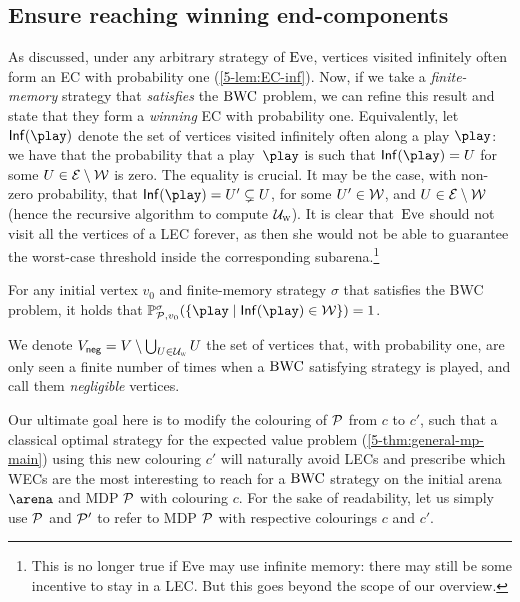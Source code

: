 \subsection*{Ensure reaching winning end-components} As discussed, under any arbitrary strategy of $\text{Eve}$, vertices visited infinitely often form an EC with probability one (\cref{5-lem:EC-inf}). Now, if we take a \textit{finite-memory} strategy that \textit{satisfies} the $\text{BWC}$ problem, we can refine this result and state that they form a \textit{winning} EC with probability one. Equivalently, let $\infVisited{\play}$ denote the set of vertices visited infinitely often along a play $\play$: we have that the probability that a play~$\play$ is such that $\infVisited{\play} = \ec$ for some $U \in \mathcal{E} \setminus \mathcal{W}$ is zero. The equality is crucial. It may be the case, with non-zero probability, that $\infVisited{\play} = \ec' \subsetneq \ec$, for some $U' \in \mathcal{W}$, and $U \in \mathcal{E} \setminus \mathcal{W}$ (hence the recursive algorithm to compute $\mathcal{U}_{\textsc{w}}$). It is clear that~$\text{Eve}$ should not visit all the vertices of a LEC forever, as then she would not be able to guarantee the worst-case threshold inside the corresponding subarena.\footnote{This is no longer true if Eve may use infinite memory: there may still be some incentive to stay in a LEC. But this goes beyond the scope of our overview.}

\begin{lemma}
\label{12-lem:EC-inf}
For any initial vertex $ v_0 $ and finite-memory strategy $ \sigma $ that satisfies the BWC problem, it holds that $ \probm^\sigma_{\markovProcess, v_0} ( \{\play \mid \infVisited{\play} \in \winningECs \}) = 1 $. 
\end{lemma}

We denote $V_{{\sf neg}} = V \setminus \bigcup_{U \in \mathcal{U}_{\textsc{w}}} U$ the set of vertices that, with probability one, are only seen a finite number of times when a $\text{BWC}$ satisfying strategy is played, and call them \textit{negligible} vertices.

Our ultimate goal here is to modify the colouring of ${\mathcal{P}}$ from $c$ to $c'$, such that a classical optimal strategy for the expected value problem (\cref{5-thm:general-mp-main}) using this new colouring $c'$ will naturally avoid LECs and prescribe which WECs are the most interesting to reach for a $\text{BWC}$ strategy on the initial arena $\arena$ and MDP ${\mathcal{P}}$ with colouring $c$. For the sake of readability, let us simply use ${\mathcal{P}}$ and ${\mathcal{P}}'$ to refer to MDP ${\mathcal{P}}$ with respective colourings $c$ and $c'$.


